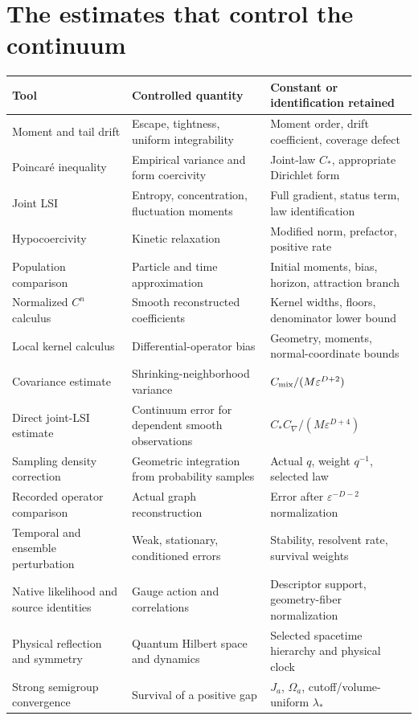 \documentclass[11pt,a4paper]{article}
\begin{document}
\section{The estimates that control the continuum}
\small
\begin{longtable}{@{}>{\raggedright\arraybackslash}p{}>{\raggedright\arraybackslash}p{}>{\raggedright\arraybackslash}p{}@{}}
\toprule Tool & Controlled quantity & Constant or identification retained\\\midrule\endhead
Moment and tail drift & Escape, tightness, uniform integrability & Moment order, drift coefficient, coverage defect\\
Poincar\'e inequality & Empirical variance and form coercivity & Joint-law \(C_*\), appropriate Dirichlet form\\
Joint LSI & Entropy, concentration, fluctuation moments & Full gradient, status term, law identification\\
Hypocoercivity & Kinetic relaxation & Modified norm, prefactor, positive rate\\
Population comparison & Particle and time approximation & Initial moments, bias, horizon, attraction branch\\
Normalized \(C^n\) calculus & Smooth reconstructed coefficients & Kernel widths, floors, denominator lower bound\\
Local kernel calculus & Differential-operator bias & Geometry, moments, normal-coordinate bounds\\
Covariance estimate & Shrinking-neighborhood variance & \(C_{\rm mix}/(M\varepsilon^{D+2})\)\\
Direct joint-LSI estimate & Continuum error for dependent smooth observations & \(C_*C_\nabla/(M\varepsilon^{D+4})\)\\
Sampling density correction & Geometric integration from probability samples & Actual \(q\), weight \(q^{-1}\), selected law\\
Recorded operator comparison & Actual graph reconstruction & Error after \(\varepsilon^{-D-2}\) normalization\\
Temporal and ensemble perturbation & Weak, stationary, conditioned errors & Stability, resolvent rate, survival weights\\
Native likelihood and source identities & Gauge action and correlations & Descriptor support, geometry-fiber normalization\\
Physical reflection and symmetry & Quantum Hilbert space and dynamics & Selected spacetime hierarchy and physical clock\\
Strong semigroup convergence & Survival of a positive gap & \(J_a\), \(\Omega_a\), cutoff/volume-uniform \(\lambda_*\)\\
\bottomrule
\end{longtable}
\normalsize
\end{document}
